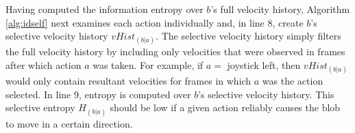 \documentclass{acm_proc_article-sp}
\begin{document}
Having computed the information entropy over $b$'s full velocity history, Algorithm \ref{alg:idself} next examines each action individually and, in line 8, create $b$'s selective velocity history $vHist_{(b|a)}$. The selective velocity history simply filters the full velocity history by including only velocities that were observed in frames after which action $a$ was taken. For example, if $a = $ joystick left, then $vHist_{(b|a)}$ would only contain resultant velocities for frames in which $a$ was the action selected. In line 9, entropy is computed over $b$'s selective velocity history. This selective entropy $H_{(b|a)}$ should be low if a given action reliably causes the blob to move in a certain direction.

\begin{figure}
  \centering
  \hspace{.1in}
  \hspace{.1in}
  \hspace{.1in}

\end{figure}
\end{document}
